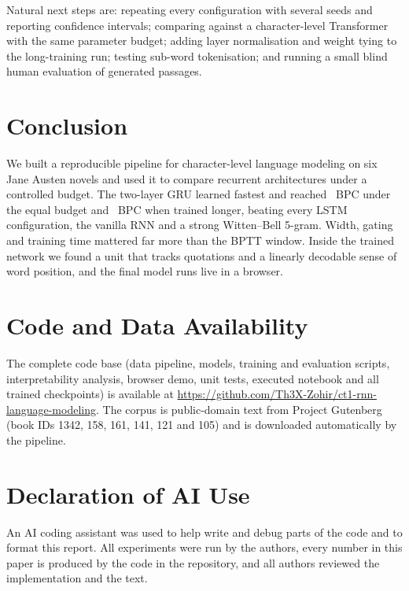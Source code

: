\documentclass[journal,a4paper]{IEEEtran}
\begin{document}
Natural next steps are: repeating every configuration with several seeds and reporting confidence intervals; comparing against a character-level Transformer with the same parameter budget; adding layer normalisation and weight tying to the long-training run; testing sub-word tokenisation; and running a small blind human evaluation of generated passages.

\section{Conclusion}
We built a reproducible pipeline for character-level language modeling on six Jane Austen novels and used it to compare recurrent architectures under a controlled budget. The two-layer GRU learned fastest and reached \tbpcgru~BPC under the equal budget and \bestbpc~BPC when trained longer, beating every LSTM configuration, the vanilla RNN and a strong Witten--Bell 5-gram. Width, gating and training time mattered far more than the BPTT window. Inside the trained network we found a unit that tracks quotations and a linearly decodable sense of word position, and the final model runs live in a browser.

\section*{Code and Data Availability}
The complete code base (data pipeline, models, training and evaluation scripts, interpretability analysis, browser demo, unit tests, executed notebook and all trained checkpoints) is available at \url{https://github.com/Th3X-Zohir/ct1-rnn-language-modeling}. The corpus is public-domain text from Project Gutenberg (book IDs 1342, 158, 161, 141, 121 and 105) and is downloaded automatically by the pipeline.

\section*{Declaration of AI Use}
An AI coding assistant was used to help write and debug parts of the code and to format this report. All experiments were run by the authors, every number in this paper is produced by the code in the repository, and all authors reviewed the implementation and the text.



\end{document}
